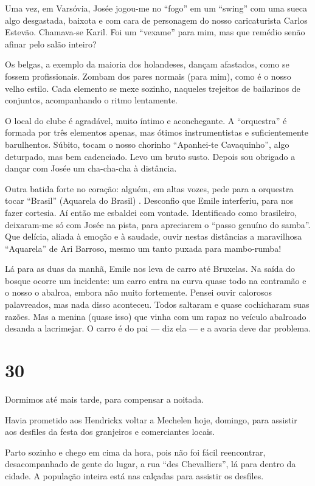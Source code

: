 Uma vez, em Varsóvia, Josée jogou-me no ``fogo'' em um ``swing'' com uma sueca algo desgastada, baixota e com cara de personagem do nosso caricaturista Carlos Estevão. Chamava-se Karil. Foi um ``vexame'' para mim, mas que remédio senão afinar pelo salão inteiro?

Os belgas, a exemplo da maioria dos holandeses, dançam afastados, como se fossem profissionais. Zombam dos pares normais (para mim), como é o nosso velho estilo. Cada elemento se mexe sozinho, naqueles trejeitos de bailarinos de conjuntos, acompanhando o ritmo lentamente.

O local do clube é agradável, muito íntimo e aconchegante. A ``orquestra'' é formada por três elementos apenas, mas ótimos instrumentistas e suficientemente barulhentos. Súbito, tocam o nosso chorinho ``Apanhei-te Cavaquinho'', algo deturpado, mas bem cadenciado. Levo um bruto susto. Depois sou obrigado a dançar com Josée um cha-cha-cha à distância.

Outra batida forte no coração: alguém, em altas vozes, pede para a orquestra tocar ``Brasil'' (Aquarela do Brasil) . Desconfio que Emile interferiu, para nos fazer cortesia. Aí então me esbaldei com vontade. Identificado como brasileiro, deixaram-me só com Josée na pista, para apreciarem o ``passo genuíno do samba''. Que delícia, aliada à emoção e à saudade, ouvir nestas distâncias a maravilhosa ``Aquarela'' de Ari Barroso, mesmo um tanto puxada para mambo-rumba!

Lá para as duas da manhã, Emile nos leva de carro até Bruxelas. Na saída do bosque ocorre um incidente: um carro entra na curva quase todo na contramão e o nosso o abalroa, embora não muito fortemente. Pensei ouvir calorosos palavreados, mas nada disso aconteceu. Todos saltaram e quase cochicharam suas razões. Mas a menina (quase isso) que vinha com um rapaz no veículo abalroado desanda a lacrimejar. O carro é do pai --- diz ela --- e a avaria deve dar problema.

\section*{30 \adfflatleafright {}}
Dormimos até mais tarde, para compensar a noitada.

Havia prometido aos Hendrickx voltar a Mechelen hoje, domingo, para assistir aos desfiles da festa dos granjeiros e comerciantes locais.

Parto sozinho e chego em cima da hora, pois não foi fácil reencontrar, desacompanhado de gente do lugar, a rua ``des Chevalliers'', lá para dentro da cidade. A população inteira está nas calçadas para assistir os desfiles.

